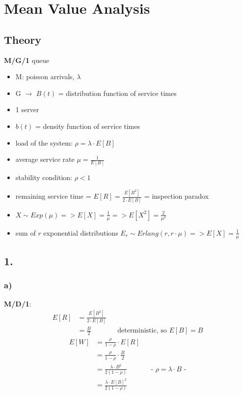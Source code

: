 \section{ Mean Value Analysis }

\subsection*{ Theory }

\textbf{M/G/1} queue
\begin{itemize}
\item  M: poisson arrivals, $\lambda $
\item  G $\rightarrow$ $B\left(t\right)$ = distribution function of service times
\item  1 server
\end{itemize}

\begin{itemize}
\item  $b\left(t\right)$ = density function of service times
\item  load of the system: $\rho =\lambda \cdot E\left[B\right]$
\item  average service rate $\mu =\frac{1}{E\left[B\right]}$
\item  stability condition: $\rho < 1$
\item  remaining service time = $E\left[R\right]=\frac{E\left[B^{2}\right]}{2\cdot E\left[B\right]}$ = inspection paradox
\item  $X\sim Exp \left(\mu \right)=> E\left[X\right]=\frac{1}{\mu }=> E\left[X^{2}\right]=\frac{2}{\mu ^{2}}$
\item  sum of $r$ exponential distributions $E_{r}\sim Erlang \left(r,r\cdot \mu \right)=> E\left[X\right]=\frac{1}{\mu }$
\end{itemize}

\subsection*{ 1. }

\subsubsection*{ a) }

\textbf{M/D/1}:
\begin{align*}
E\left[R\right]&=\frac{E\left[B^{2}\right]}{2\cdot E\left[B\right]}\\
&=\frac{B}{2} && \text{deterministic, so $E[B] = B$}
\end{align*}
\begin{align*}
E\left[W\right]&=\frac{\rho }{1-\rho }\cdot E[R]\\
&=\frac{\rho }{1-\rho }\cdot \frac{B}{2}\\
&=\frac{\lambda \cdot B^{2}}{2\left(1-\rho \right)}&& \text{-  $\rho =\lambda \cdot B$ -}\\
&=\frac{\lambda \cdot E\left[B\right]^{2}}{2\left(1-\rho \right)}
\end{align*}

